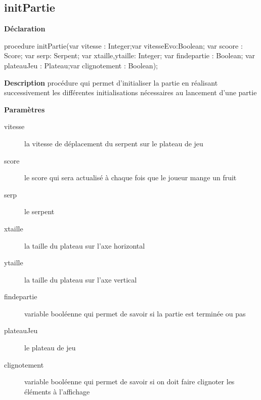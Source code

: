 \documentclass{report}
\newif\ifpdf
\begin{document}
\subsection*{initPartie}
\fi
\label{Initialisation-initPartie}
\begin{list}{}{
\setlength{\itemindent}{0cm}
\setlength{\listparindent}{0cm}
\setlength{\leftmargin}{\evensidemargin}
\addtolength{\leftmargin}{\tmplength}
\settowidth{\labelsep}{X}
\addtolength{\leftmargin}{\labelsep}
\setlength{\labelwidth}{\tmplength}
}
\item[\textbf{Déclaration}\hfill]
\ifpdf
\begin{flushleft}
\fi
\begin{ttfamily}
procedure initPartie(var vitesse : Integer;var vitesseEvo:Boolean; var scoore : Score; var serp: Serpent; var xtaille,ytaille: Integer; var findepartie : Boolean; var plateauJeu : Plateau;var clignotement : Boolean);\end{ttfamily}

\ifpdf
\end{flushleft}
\fi

\par
\item[\textbf{Description}]
procédure qui permet d'initialiser la partie en réalisant successivement les différentes initialisations nécessaires au lancement d'une partie        \par
\item[\textbf{Paramètres}]
\begin{description}
\item[vitesse] la vitesse de déplacement du serpent sur le plateau de jeu
\item[score] le score qui sera actualisé à chaque fois que le joueur mange un fruit
\item[serp] le serpent
\item[xtaille] la taille du plateau sur l'axe horizontal
\item[ytaille] la taille du plateau sur l'axe vertical
\item[findepartie] variable booléenne qui permet de savoir si la partie est terminée ou pas
\item[plateauJeu] le plateau de jeu
\item[clignotement] variable booléenne qui permet de savoir si on doit faire clignoter les éléments à l'affichage
\end{description}


\end{list}
\end{document}
